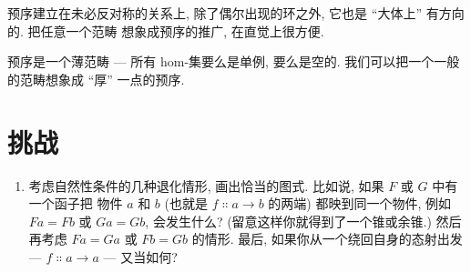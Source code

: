 预序建立在未必反对称的关系上, 除了偶尔出现的环之外, 它也是 ``大体上'' 有方向的. 把任意一个范畴
想象成预序的推广, 在直觉上很方便.

预序是一个薄范畴 --- 所有 hom-集要么是单例, 要么是空的. 我们可以把一个一般的范畴想象成
``厚'' 一点的预序.

\section{挑战}

\begin{enumerate}
  \tightlist
  \item
        考虑自然性条件的几种退化情形, 画出恰当的图式. 比如说, 如果 $F$ 或 $G$ 中有一个函子把
        物件 $a$ 和 $b$ (也就是 $f \Colon a \to b$ 的两端) 都映到同一个物件, 例如
        $F a = F b$ 或 $G a = G b$, 会发生什么? (留意这样你就得到了一个锥或余锥.) 然后再考虑
        $F a = G a$ 或 $F b = G b$ 的情形. 最后, 如果你从一个绕回自身的态射出发 ---
        $f \Colon a \to a$ --- 又当如何?
\end{enumerate}
